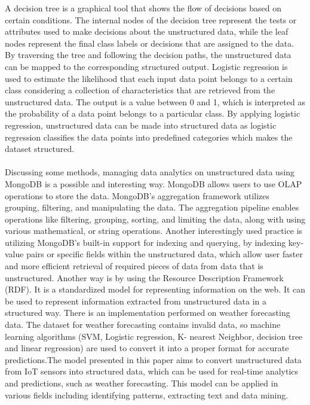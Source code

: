 \documentclass[]{tukseminar}
\begin{document}
A decision tree is a graphical tool that shows the flow of decisions based on certain conditions. The internal nodes of the decision tree represent the tests or attributes used to make decisions about the unstructured data, while the leaf nodes represent the final class labels or decisions that are assigned to the data. By traversing the tree and following the decision paths, the unstructured data can be mapped to the corresponding structured output.%
Logistic regression is used to estimate the likelihood that each input data point belongs to a certain class considering a collection of characteristics that are retrieved from the unstructured data. The output is a value between 0 and 1, which is interpreted as the probability of a data point belongs to a particular class. By applying logistic regression, unstructured data can be made into structured data as logistic regression classifies the data points into predefined categories which makes the dataset structured.
\\\\
Discussing some methods, managing data analytics on unstructured data using MongoDB is a possible and interesting way. MongoDB allows users to use OLAP operations to store the data. MongoDB's aggregation framework utilizes grouping, filtering, and manipulating the data. The aggregation pipeline enables operations like filtering, grouping, sorting, and limiting the data, along with using various mathematical, or string operations. Another interestingly used practice is utilizing MongoDB's built-in support for indexing and querying, by indexing key-value pairs or specific fields within the unstructured data, which allow user faster and more efficient retrieval of required pieces of data from data that is unstructured.%
Another way is by using the Resource Description Framework (RDF). It is a standardized model for representing information on the web. It can be used to represent information extracted from unstructured data in a structured way. There is an implementation performed on weather forecasting data. The dataset for weather forecasting contains invalid data, so machine learning algorithms (SVM, Logistic regression, K- nearest Neighbor, decision tree and linear regression) are used to convert it into a proper format for accurate predictions.The model presented in this paper aims to convert unstructured data from IoT sensors into structured data, which can be used for real-time analytics and predictions, such as weather forecasting. This model can be applied in various fields including identifying patterns, extracting text and data mining.
\end{document}
